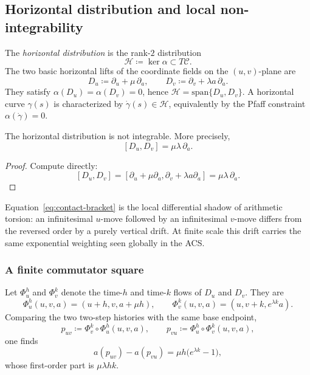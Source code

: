 \subsection{Horizontal distribution and local non-integrability}\label{subsec:contact-horizontal}

The \emph{horizontal distribution} is the rank-$2$ distribution
\[
\mathcal{H}\coloneqq \ker\alpha\subset T\mathcal{C}.
\]
The two basic horizontal lifts of the coordinate fields on the $(u,v)$-plane are
\begin{equation}\label{eq:contact-horizontal-basis}
D_u\coloneqq \partial_u+\mu\,\partial_a,
\qquad
D_v\coloneqq \partial_v+\lambda a\,\partial_a.
\end{equation}
They satisfy $\alpha(D_u)=\alpha(D_v)=0$, hence $\mathcal{H}=\mathrm{span}\{D_u,D_v\}$. A horizontal curve $\gamma(s)$ is characterized by $\dot\gamma(s)\in\mathcal{H}$, equivalently by the Pfaff constraint $\alpha(\dot\gamma)=0$.

\begin{proposition}\label{prop:contact-bracket}
The horizontal distribution is not integrable. More precisely,
\begin{equation}\label{eq:contact-bracket}
[D_u,D_v]=\mu\lambda\,\partial_a.
\end{equation}
\end{proposition}

\begin{proof}
Compute directly:
\[
[D_u,D_v]=[\partial_u+\mu\partial_a,\partial_v+\lambda a\partial_a]=\mu\lambda\,\partial_a.
\]
\end{proof}

Equation~\eqref{eq:contact-bracket} is the local differential shadow of arithmetic torsion: an infinitesimal $u$-move followed by an infinitesimal $v$-move differs from the reversed order by a purely vertical drift. At finite scale this drift carries the same exponential weighting seen globally in the ACS.

\subsubsection*{A finite commutator square}
Let $\Phi_u^h$ and $\Phi_v^k$ denote the time-$h$ and time-$k$ flows of $D_u$ and $D_v$. They are
\[
\Phi_u^h(u,v,a)=(u+h,v,a+\mu h),
\qquad
\Phi_v^k(u,v,a)=(u,v+k,e^{\lambda k}a).
\]
Comparing the two two-step histories with the same base endpoint,
\[
p_{uv}\coloneqq \Phi_v^k\!\circ\Phi_u^h(u,v,a),
\qquad
p_{vu}\coloneqq \Phi_u^h\!\circ\Phi_v^k(u,v,a),
\]
one finds
\begin{equation}\label{eq:contact-finite-torsion}
a(p_{uv})-a(p_{vu})=\mu h\bigl(e^{\lambda k}-1\bigr),
\end{equation}
whose first-order part is $\mu\lambda hk$.

